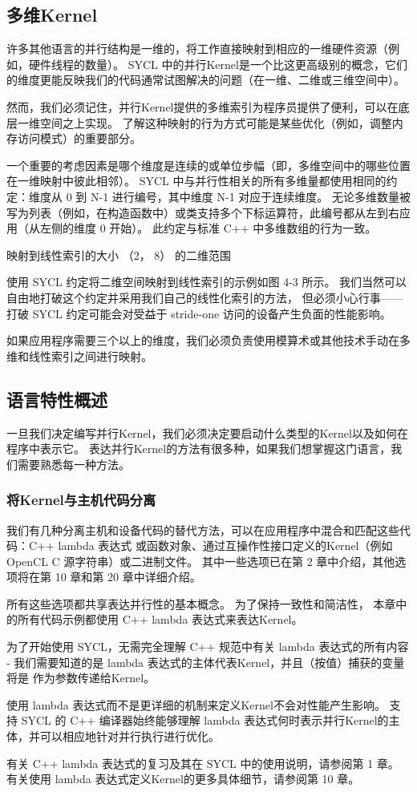 \subsection{多维Kernel}
许多其他语言的并行结构是一维的，将工作直接映射到相应的一维硬件资源（例如，硬件线程的数量）。 
SYCL 中的并行Kernel是一个比这更高级别的概念，它们的维度更能反映我们的代码通常试图解决的问题（在一维、二维或三维空间中）。

然而，我们必须记住，并行Kernel提供的多维索引为程序员提供了便利，可以在底层一维空间之上实现。 
了解这种映射的行为方式可能是某些优化（例如，调整内存访问模式）的重要部分。

一个重要的考虑因素是哪个维度是连续的或单位步幅（即，多维空间中的哪些位置在一维映射中彼此相邻）。 
SYCL 中与并行性相关的所有多维量都使用相同的约定：维度从 0 到 N-1 进行编号，其中维度 N-1 对应于连续维度。 
无论多维数量被写为列表（例如，在构造函数中）或类支持多个下标运算符，此编号都从左到右应用（从左侧的维度 0 开始）。 
此约定与标准 C++ 中多维数组的行为一致。

{\color{red} 映射到线性索引的大小 （2， 8） 的二维范围}

使用 SYCL 约定将二维空间映射到线性索引的示例如图 4-3 所示。 
我们当然可以自由地打破这个约定并采用我们自己的线性化索引的方法，
但必须小心行事——打破 SYCL 约定可能会对受益于 stride-one 访问的设备产生负面的性能影响。

如果应用程序需要三个以上的维度，我们必须负责使用模算术或其他技术手动在多维和线性索引之间进行映射。

\subsection{语言特性概述}
一旦我们决定编写并行Kernel，我们必须决定要启动什么类型的Kernel以及如何在程序中表示它。 
表达并行Kernel的方法有很多种，如果我们想掌握这门语言，我们需要熟悉每一种方法。

\subsubsection{将Kernel与主机代码分离}
我们有几种分离主机和设备代码的替代方法，可以在应用程序中混合和匹配这些代码：C++ lambda 表达式
或函数对象、通过互操作性接口定义的Kernel（例如 OpenCL C 源字符串）或二进制文件。 
其中一些选项已在第 2 章中介绍，其他选项将在第 10 章和第 20 章中详细介绍。

所有这些选项都共享表达并行性的基本概念。 为了保持一致性和简洁性，
本章中的所有代码示例都使用 C++ lambda 表达式来表达Kernel。

\begin{remark}
为了开始使用 SYCL，无需完全理解 C++ 规范中有关 lambda 表达式的所有内容 - 
我们需要知道的是 lambda 表达式的主体代表Kernel，并且（按值）捕获的变量将是 作为参数传递给Kernel。

使用 lambda 表达式而不是更详细的机制来定义Kernel不会对性能产生影响。 
支持 SYCL 的 C++ 编译器始终能够理解 lambda 表达式何时表示并行Kernel的主体，并可以相应地针对并行执行进行优化。

有关 C++ lambda 表达式的复习及其在 SYCL 中的使用说明，请参阅第 1 章。
有关使用 lambda 表达式定义Kernel的更多具体细节，请参阅第 10 章。
\end{remark}


